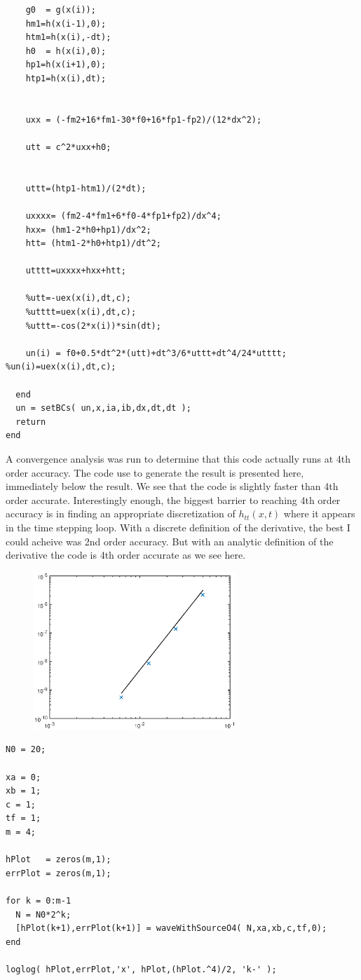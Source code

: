 \begin{lstlisting}
    g0  = g(x(i));
    hm1=h(x(i-1),0);
    htm1=h(x(i),-dt);
    h0  = h(x(i),0);
    hp1=h(x(i+1),0);
    htp1=h(x(i),dt);
    
    
    uxx = (-fm2+16*fm1-30*f0+16*fp1-fp2)/(12*dx^2);
    
    utt = c^2*uxx+h0;
    
    
    uttt=(htp1-htm1)/(2*dt);
    
    uxxxx= (fm2-4*fm1+6*f0-4*fp1+fp2)/dx^4;
    hxx= (hm1-2*h0+hp1)/dx^2;
    htt= (htm1-2*h0+htp1)/dt^2;
    
    utttt=uxxxx+hxx+htt;

    %utt=-uex(x(i),dt,c);
    %utttt=uex(x(i),dt,c);
    %uttt=-cos(2*x(i))*sin(dt);
    
    un(i) = f0+0.5*dt^2*(utt)+dt^3/6*uttt+dt^4/24*utttt;
%un(i)=uex(x(i),dt,c);

  end
  un = setBCs( un,x,ia,ib,dx,dt,dt );
  return
end
\end{lstlisting}
A convergence analysis was run to determine that this code actually runs at 4th order accuracy. The code use to generate the result is presented here, immediately below the result. We see that the code is slightly faster than 4th order accurate. Interestingly enough, the biggest barrier to reaching 4th order accuracy is in finding an appropriate discretization of $h_{tt}(x,t)$ where it appears in the time stepping loop. With a discrete definition of the derivative, the best I could acheive was 2nd order accuracy. But with an analytic definition of the derivative the code is 4th order accurate as we see here.

\begin{figure}[h]
\centering
\includegraphics[width=3in]{convStudyO4}
\end{figure}
\begin{lstlisting}
N0 = 20;

xa = 0;
xb = 1;
c = 1;
tf = 1;
m = 4;

hPlot   = zeros(m,1);
errPlot = zeros(m,1);

for k = 0:m-1
  N = N0*2^k;  
  [hPlot(k+1),errPlot(k+1)] = waveWithSourceO4( N,xa,xb,c,tf,0);
end

loglog( hPlot,errPlot,'x', hPlot,(hPlot.^4)/2, 'k-' );
\end{lstlisting}
\eenum
\eenum



















